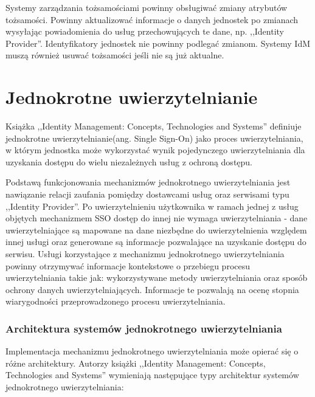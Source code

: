 		Systemy zarządzania tożsamościami powinny obsługiwać zmiany atrybutów tożsamości. Powinny aktualizować informacje o danych jednostek po zmianach wysyłając powiadomienia do usług przechowujących te dane, np. ,,Identity Provider''. Identyfikatory jednostek nie powinny podlegać zmianom. Systemy IdM muszą również usuwać tożsamości jeśli nie są już aktualne.

\section{Jednokrotne uwierzytelnianie}

	Książka ,,Identity Management: Concepts, Technologies and Systems'' definiuje jednokrotne uwierzytelnianie(ang. Single Sign-On) jako proces uwierzytelniania, w którym jednostka może wykorzystać wynik pojedynczego uwierzytelniania dla uzyskania dostępu do wielu niezależnych usług z ochroną dostępu\cite{Bertino11}. 

	Podstawą funkcjonowania mechanizmów jednokrotnego uwierzytelniania jest nawiązanie relacji zaufania pomiędzy dostawcami usług oraz serwisami typu ,,Identity Provider''. Po uwierzytelnieniu użytkownika w ramach jednej z usług objętych mechanizmem SSO dostęp do innej nie wymaga uwierzytelniania - dane uwierzytelniające są mapowane na dane niezbędne do uwierzytelnienia względem innej usługi oraz generowane są informacje pozwalające na uzyskanie dostępu do serwisu. Usługi korzystające z mechanizmu jednokrotnego uwierzytelniania powinny otrzymywać informacje kontekstowe o przebiegu procesu uwierzytelniania takie jak: wykorzystywane metody uwierzytelniania oraz sposób ochrony danych uwierzytelniających. Informacje te pozwalają na ocenę stopnia wiarygodności przeprowadzonego procesu uwierzytelniania.

	\subsubsection{Architektura systemów jednokrotnego uwierzytelniania}

		Implementacja mechanizmu jednokrotnego uwierzytelniania może opierać się o różne architektury. Autorzy książki ,,Identity Management: Concepts, Technologies and Systems''\cite{Bertino11} wymieniają następujące typy architektur systemów jednokrotnego uwierzytelniania:

